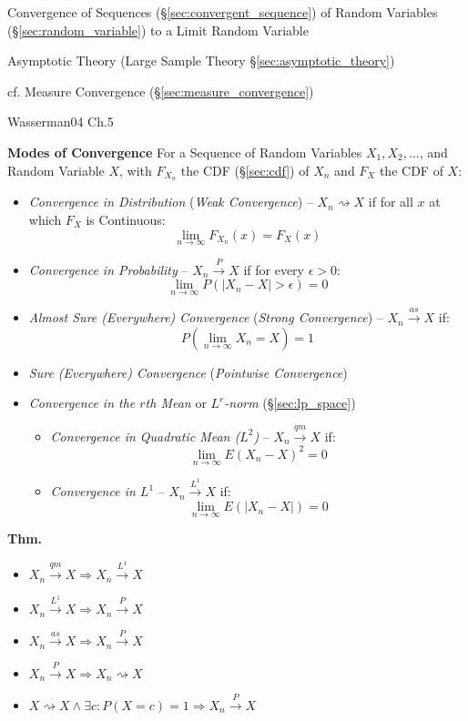 Convergence of Sequences (\S\ref{sec:convergent_sequence}) of Random Variables
(\S\ref{sec:random_variable}) to a Limit Random Variable

\fist Asymptotic Theory (Large Sample Theory \S\ref{sec:asymptotic_theory})

\fist cf. Measure Convergence (\S\ref{sec:measure_convergence})

Wasserman04 Ch.5

\textbf{Modes of Convergence}
For a Sequence of Random Variables $X_1, X_2, \ldots$, and Random Variable $X$,
with $F_{X_n}$ the CDF (\S\ref{sec:cdf}) of $X_n$ and $F_X$ the CDF of $X$:
\begin{itemize}
  \item \emph{Convergence in Distribution} (\emph{Weak Convergence}) --
    $X_n \rightsquigarrow X$ if for all $x$ at which $F_X$ is Continuous:
    \[
      \lim_{n\to\infty} F_{X_n}(x) = F_X(x)
    \]
  \item \emph{Convergence in Probability} -- $X_n \xrightarrow{P} X$ if for
    every $\epsilon > 0$:
    \[
      \lim_{n\to\infty}P(|X_n - X| > \epsilon) = 0
    \]
  \item \emph{Almost Sure (Everywhere) Convergence} (\emph{Strong Convergence})
    -- $X_n \xrightarrow{as} X$ if:
    \[
      P(\lim_{n\to\infty}X_n = X) = 1
    \]
  \item \emph{Sure (Everywhere) Convergence} (\emph{Pointwise Convergence})
  \item \emph{Convergence in the $r$th Mean} or \emph{$L^r$-norm}
    (\S\ref{sec:lp_space})
    \begin{itemize}
      \item \emph{Convergence in Quadratic Mean ($L^2$)} --
        $X_n \xrightarrow{qm} X$ if:
        \[
          \lim_{n\to\infty} E(X_n - X)^2 = 0
        \]
      \item \emph{Convergence in $L^1$} -- $X_n \xrightarrow{L^1} X$ if:
        \[
          \lim_{n\to\infty} E(|X_n - X|) = 0
        \]
    \end{itemize}
\end{itemize}

\textbf{Thm.}
\begin{itemize}
  \item $X_n \xrightarrow{qm} X \Rightarrow X_n \xrightarrow{L^1} X$
  \item $X_n \xrightarrow{L^1} X \Rightarrow X_n \xrightarrow{P} X$
  \item $X_n \xrightarrow{as} X \Rightarrow X_n \xrightarrow{P} X$
  \item $X_n \xrightarrow{P} X \Rightarrow X_n \rightsquigarrow X$
  \item $X \rightsquigarrow X \wedge \exists c : P(X = c) = 1 \Rightarrow
    X_n \xrightarrow{P} X$
\end{itemize}

